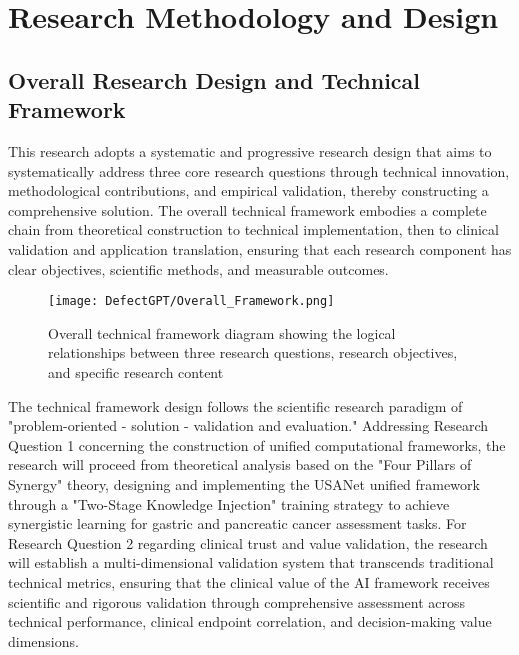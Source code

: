 
\chapter{Research Methodology and Design} \label{chp:methodology}

\section{Overall Research Design and Technical Framework}

This research adopts a systematic and progressive research design that aims to systematically address three core research questions through technical innovation, methodological contributions, and empirical validation, thereby constructing a comprehensive solution. The overall technical framework embodies a complete chain from theoretical construction to technical implementation, then to clinical validation and application translation, ensuring that each research component has clear objectives, scientific methods, and measurable outcomes.

\begin{figure}[htbp]
\centering
\texttt{[image: DefectGPT/Overall\_Framework.png]}
\caption{Overall technical framework diagram showing the logical relationships between three research questions, research objectives, and specific research content}
\label{fig:overall_framework}
\end{figure}

The technical framework design follows the scientific research paradigm of "problem-oriented - solution - validation and evaluation." Addressing Research Question 1 concerning the construction of unified computational frameworks, the research will proceed from theoretical analysis based on the "Four Pillars of Synergy" theory, designing and implementing the USANet unified framework through a "Two-Stage Knowledge Injection" training strategy to achieve synergistic learning for gastric and pancreatic cancer assessment tasks. For Research Question 2 regarding clinical trust and value validation, the research will establish a multi-dimensional validation system that transcends traditional technical metrics, ensuring that the clinical value of the AI framework receives scientific and rigorous validation through comprehensive assessment across technical performance, clinical endpoint correlation, and decision-making value dimensions.

